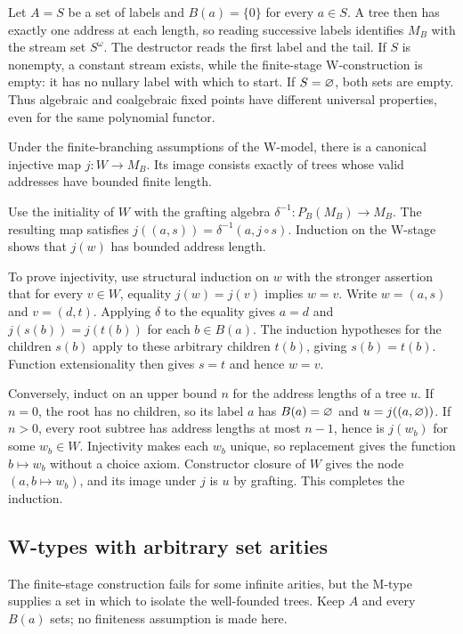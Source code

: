 \begin{example}
Let $A=S$ be a set of labels and $B(a)=\{0\}$ for every $a\in S$.
A tree then has exactly one address at each length, so reading successive
labels identifies $M_B$ with the stream set $S^\omega$. The destructor
reads the first label and the tail. If $S$ is nonempty, a constant stream
exists, while the finite-stage W-construction is empty: it has no
nullary label with which to start. If $S=\varnothing$, both sets are
empty. Thus algebraic and coalgebraic fixed points have different
universal properties, even for the same polynomial functor.
\end{example}

\begin{proposition}
Under the finite-branching assumptions of the W-model, there is a
canonical injective map $j:W\to M_B$. Its image consists exactly of
trees whose valid addresses have bounded finite length.
\end{proposition}
\Proof
Use the initiality of $W$ with the grafting algebra
$\delta^{-1}:P_B(M_B)\to M_B$. The resulting map satisfies
$j((a,s))=\delta^{-1}(a,j\circ s)$. Induction on the W-stage shows that
$j(w)$ has bounded address length.

To prove injectivity, use structural induction on $w$ with the stronger
assertion that for every $v\in W$, equality $j(w)=j(v)$ implies $w=v$.
Write $w=(a,s)$ and $v=(d,t)$. Applying $\delta$ to the equality gives
$a=d$ and $j(s(b))=j(t(b))$ for each $b\in B(a)$. The induction
hypotheses for the children $s(b)$ apply to these arbitrary children
$t(b)$, giving $s(b)=t(b)$. Function extensionality then gives $s=t$
and hence $w=v$.

Conversely, induct on an upper bound $n$ for the address lengths of a
tree $u$. If $n=0$, the root has no children, so its label $a$ has
$B(a)=\varnothing$ and $u=j((a,\varnothing))$. If $n>0$, every root
subtree has address lengths at most $n-1$, hence is $j(w_b)$ for some
$w_b\in W$. Injectivity makes each $w_b$ unique, so replacement gives
the function $b\mapsto w_b$ without a choice axiom. Constructor closure
of $W$ gives the node $(a,b\mapsto w_b)$, and its image under $j$ is
$u$ by grafting. This completes the induction.
\Done

\subsection{W-types with arbitrary set arities}
The finite-stage construction fails for some infinite arities, but the
M-type supplies a set in which to isolate the well-founded trees. Keep
$A$ and every $B(a)$ sets; no finiteness assumption is made here.

